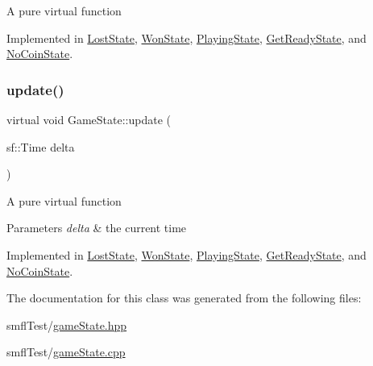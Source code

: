 A pure virtual function 

Implemented in \hyperlink{class_lost_state_ab0ec749961cfe909dc61289d14444a71}{Lost\+State}, \hyperlink{class_won_state_ab17f101d9ab90e60259e28b8775a76ec}{Won\+State}, \hyperlink{class_playing_state_ae59ff244a6cd4a3c6f6fcaef41f4d8c5}{Playing\+State}, \hyperlink{class_get_ready_state_a414a505ec783b1bf577b1b859abaee46}{Get\+Ready\+State}, and \hyperlink{class_no_coin_state_a47dd2924ce9601b45ee11e0d9b8452f7}{No\+Coin\+State}.

\mbox{\label{class_game_state_ab1fe4312f7ce88e7dc11f9935dee67d1}} 
\subsubsection{\texorpdfstring{update()}{update()}}
{\footnotesize\ttfamily virtual void Game\+State\+::update (\begin{DoxyParamCaption}\item[{sf\+::\+Time}]{delta }\end{DoxyParamCaption})\hspace{0.3cm}{\ttfamily [pure virtual]}}

A pure virtual function


\begin{DoxyParams}{Parameters}
{\em delta} & the current time \\
\hline
\end{DoxyParams}


Implemented in \hyperlink{class_lost_state_a16d5e12284d03f8dd6b25a897b25839b}{Lost\+State}, \hyperlink{class_won_state_a0ea91513e3df2eafbe8ef7b9810eaff1}{Won\+State}, \hyperlink{class_playing_state_a62b3904b8a971fed2f8fab4eb73bd9e5}{Playing\+State}, \hyperlink{class_get_ready_state_a6e5a1035b4ee7a52aa28027a0b99dd8a}{Get\+Ready\+State}, and \hyperlink{class_no_coin_state_af0194851310c6df176770713341a8b80}{No\+Coin\+State}.



The documentation for this class was generated from the following files\+:\begin{DoxyCompactItemize}
\item 
smfl\+Test/\hyperlink{game_state_8hpp}{game\+State.\+hpp}\item 
smfl\+Test/\hyperlink{game_state_8cpp}{game\+State.\+cpp}\end{DoxyCompactItemize}
